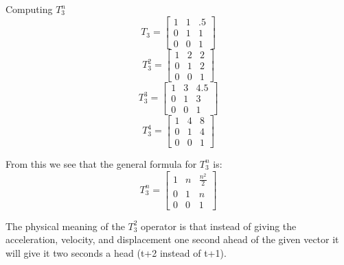 \documentclass[12pt]{article}
\begin{document}
Computing $T^{n}_{3}$\\
\[
T_{3} =
\begin{bmatrix}
1 & 1 & .5\\
0 & 1 & 1\\
0 & 0 & 1
\end{bmatrix}
\]
\[
T^{2}_{3} =
\begin{bmatrix}
1 & 2 & 2\\
0 & 1 & 2\\
0 & 0 & 1
\end{bmatrix}
\]
\[
T^{3}_{3} =
\begin{bmatrix}
1 & 3 & 4.5\\
0 & 1 & 3\\
0 & 0 & 1
\end{bmatrix}
\]
\[
T^{4}_{3} = 
\begin{bmatrix}
1 & 4 & 8\\
0 & 1 & 4\\
0 & 0 & 1
\end{bmatrix}
\]

From this we see that the general formula for $T^{n}_{3}$ is:
\[
T^{n}_{3} = 
\begin{bmatrix}
1 & n & \frac{n^{2}}{2}\\
0 & 1 & n\\
0 & 0 & 1
\end{bmatrix}
\]

The physical meaning of the $T^{2}_{3}$ operator is that instead of giving the acceleration, velocity, and displacement one second ahead of the given vector it will give it two seconds a head (t+2 instead of t+1).
\end{document}
